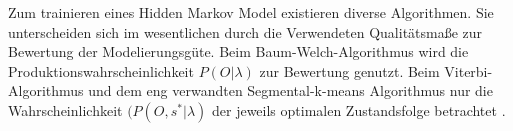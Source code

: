 Zum trainieren eines Hidden Markov Model existieren diverse Algorithmen. Sie unterscheiden sich im wesentlichen durch die Verwendeten Qualitätsmaße zur Bewertung der Modelierungsgüte. Beim Baum-Welch-Algorithmus \cite{rabiner} wird die Produktionswahrscheinlichkeit \(P(O|\lambda)\) zur Bewertung genutzt. Beim Viterbi-Algorithmus \cite{viterbi} und dem eng verwandten Segmental-k-means Algorithmus \cite{juang} nur die Wahrscheinlichkeit \((P(O,s^{*}|\lambda)\) der jeweils optimalen Zustandsfolge betrachtet \cite{mmmFink}.
